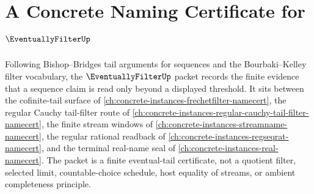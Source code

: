 \chapter{A Concrete Naming Certificate for $\EventuallyFilterUp$}
\label{ch:concrete-instances-eventually-filter-namecert}

Following Bishop--Bridges tail arguments for sequences and the Bourbaki--Kelley filter vocabulary, the $\EventuallyFilterUp$ packet records the finite evidence that a sequence claim is read only beyond a displayed threshold. It sits between the cofinite-tail surface of \autoref{ch:concrete-instances-frechetfilter-namecert}, the regular Cauchy tail-filter route of \autoref{ch:concrete-instances-regular-cauchy-tail-filter-namecert}, the finite stream windows of \autoref{ch:concrete-instances-streamname-namecert}, the regular rational readback of \autoref{ch:concrete-instances-regseqrat-namecert}, and the terminal real-name seal of \autoref{ch:concrete-instances-real-namecert}. The packet is a finite eventual-tail certificate, not a quotient filter, selected limit, countable-choice schedule, host equality of streams, or ambient completeness principle.

